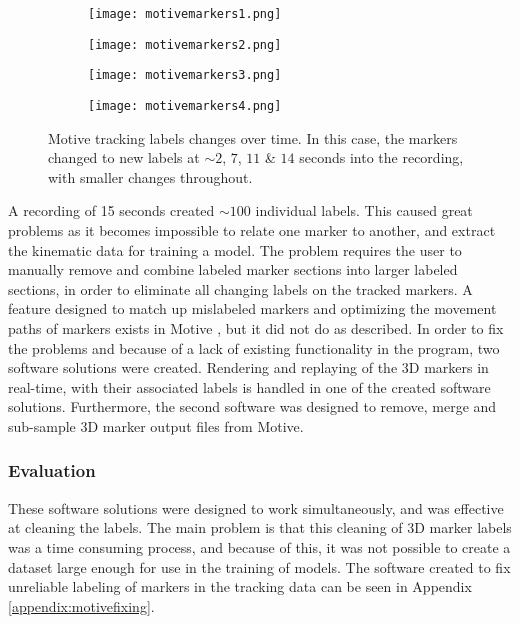 \documentclass[../main.tex]{subfiles}
\begin{document}
\begin{figure}[H]
    \centering
    \begin{subfigure}[b]{0.49\textwidth}
        \centering
        \texttt{[image: motivemarkers1.png]}
    \end{subfigure}
    \hfill
    \centering
    \begin{subfigure}[b]{0.49\textwidth}
        \centering
        \texttt{[image: motivemarkers2.png]}
    \end{subfigure}
    \hfill
    \begin{subfigure}[b]{0.49\textwidth}
        \centering
        \texttt{[image: motivemarkers3.png]}
    \end{subfigure}
    \hfill
    \begin{subfigure}[b]{0.49\textwidth}
        \centering
        \texttt{[image: motivemarkers4.png]}
    \end{subfigure}
    \caption{Motive tracking labels changes over time. In this case, the markers changed to new labels at $\sim 2$, $7$, $11$ \& $14$ seconds into the recording, with smaller changes throughout.}
    \label{fig:motivelabels}
\end{figure}

A recording of 15 seconds created $\sim 100$ individual labels.
This caused great problems as it becomes impossible to relate one marker to another, and extract the kinematic data for training a model.
The problem requires the user to manually remove and combine labeled marker sections into larger labeled sections, in order to eliminate all changing labels on the tracked markers.
A feature designed to match up mislabeled markers and optimizing the movement paths of markers exists in Motive \cite{motive}, but it did not do as described.
In order to fix the problems and because of a lack of existing functionality in the program, two software solutions were created.
Rendering and replaying of the 3D markers in real-time, with their associated labels is handled in one of the created software solutions.
Furthermore, the second software was designed to remove, merge and sub-sample 3D marker output files from Motive.

\subsubsection{Evaluation}

These software solutions were designed to work simultaneously, and was effective at cleaning the labels.
The main problem is that this cleaning of 3D marker labels was a time consuming process, and because of this, it was not possible to create a dataset large enough for use in the training of models.
The software created to fix unreliable labeling of markers in the tracking data can be seen in Appendix \ref{appendix:motivefixing}.
\end{document}
